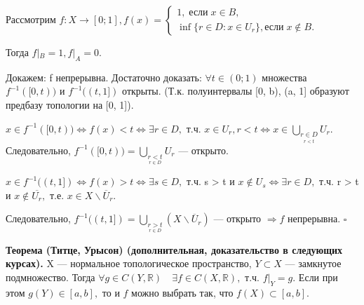 \documentclass[12pt,a4paper]{article}
\begin{document}
Рассмотрим $f\!: X \to [0; 1], f(x) = \begin{cases} 1, \; \text{если} \; x \in B, \\ \inf\{r \in D\!: x \in U_{r}\}, \text{если} \; x \notin B. \end{cases}$

Тогда $f|_{B} = 1, f|_{A} = 0.$

Докажем: f непрерывна. Достаточно доказать: $\forall t \in (0; 1)$ множества $f^{-1}([0, t))$ и $f^{-1}((t, 1])$ открыты. (Т.к. полуинтервалы [0, b), (a, 1] образуют предбазу топологии на [0, 1]).

\begin{figure}
\end{figure}

$x \in f^{-1}([0, t)) \Leftrightarrow f(x) < t \Leftrightarrow \exists r \in D,$ т.ч. $x \in U_{r}, r < t \Leftrightarrow x \in \underset{\underset{r < t}{r \in D}}{\bigcup}{U_{r}}.$ Следовательно, $f^{-1}([0, t)) = \underset{\underset{r \in D}{r < t}}{\bigcup} U_{r}$ --- открыто.

$x \in f^{-1}((t, 1]) \Leftrightarrow f(x) > t \Leftrightarrow \exists s \in D,$ т.ч. s > t и $x \notin U_{s} \Leftrightarrow \exists r \in D,$ т.ч. r > t и $x \notin \overline{U_{r}},$ т.е. $x \in X \backslash \overline{U}_{r}.$

\begin{figure}
\end{figure}

Следовательно, $f^{-1}((t, 1]) = \underset{\underset{r \in D}{r > t}}{\bigcup} (X \backslash \overline{U}_{r})$ --- открыто $\Rightarrow f$ непрерывна. $\square$

\textbf{Теорема (Титце, Урысон) (дополнительная, доказательство в следующих курсах).} X --- нормальное топологическое пространство, $Y \subset X$ --- замкнутое подмножество. Тогда $\forall g \in C(Y, \mathbb{R}) \quad \exists f \in C(X, \mathbb{R}),$ т.ч. $f|_{Y} = g.$ Если при этом $g(Y) \in [a, b],$ то и $f$ можно выбрать так, что $f(X) \subset [a, b].$ 
\end{document}
